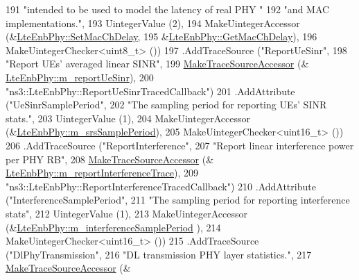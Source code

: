 \begin{DoxyCode}
191                    \textcolor{stringliteral}{"intended to be used to model the latency of real PHY "}
192                    \textcolor{stringliteral}{"and MAC implementations."},
193                    UintegerValue (2),
194                    MakeUintegerAccessor (&\hyperlink{classns3_1_1LteEnbPhy_a969782c4f1d30e0285e70bc73bb79290}{LteEnbPhy::SetMacChDelay}, 
195                                          &\hyperlink{classns3_1_1LteEnbPhy_abffa6cd054214eff16794496a4f17b71}{LteEnbPhy::GetMacChDelay}),
196                    MakeUintegerChecker<uint8\_t> ())
197     .AddTraceSource (\textcolor{stringliteral}{"ReportUeSinr"},
198                      \textcolor{stringliteral}{"Report UEs' averaged linear SINR"},
199                      \hyperlink{group__tracing_gab21a770b9855af4e8f69f7531ea4a6b0}{MakeTraceSourceAccessor} (&
      \hyperlink{classns3_1_1LteEnbPhy_a97d34e9ba36db6eb607a40c239dd408e}{LteEnbPhy::m\_reportUeSinr}),
200                      \textcolor{stringliteral}{"ns3::LteEnbPhy::ReportUeSinrTracedCallback"})
201     .AddAttribute (\textcolor{stringliteral}{"UeSinrSamplePeriod"},
202                    \textcolor{stringliteral}{"The sampling period for reporting UEs' SINR stats."},
203                    UintegerValue (1),  
204                    MakeUintegerAccessor (&\hyperlink{classns3_1_1LteEnbPhy_a16c1df8f3a289036ffc98042e9b47094}{LteEnbPhy::m\_srsSamplePeriod}),
205                    MakeUintegerChecker<uint16\_t> ())
206     .AddTraceSource (\textcolor{stringliteral}{"ReportInterference"},
207                      \textcolor{stringliteral}{"Report linear interference power per PHY RB"},
208                      \hyperlink{group__tracing_gab21a770b9855af4e8f69f7531ea4a6b0}{MakeTraceSourceAccessor} (&
      \hyperlink{classns3_1_1LteEnbPhy_ab0680f139d0eb336e9d1d3dffcee80a1}{LteEnbPhy::m\_reportInterferenceTrace}),
209                      \textcolor{stringliteral}{"ns3::LteEnbPhy::ReportInterferenceTracedCallback"})
210     .AddAttribute (\textcolor{stringliteral}{"InterferenceSamplePeriod"},
211                    \textcolor{stringliteral}{"The sampling period for reporting interference stats"},
212                    UintegerValue (1),  
213                    MakeUintegerAccessor (&\hyperlink{classns3_1_1LteEnbPhy_a0df64498bdf6e3e601ea8567c8cc94f3}{LteEnbPhy::m\_interferenceSamplePeriod}
      ),
214                    MakeUintegerChecker<uint16\_t> ())
215     .AddTraceSource (\textcolor{stringliteral}{"DlPhyTransmission"},
216                      \textcolor{stringliteral}{"DL transmission PHY layer statistics."},
217                      \hyperlink{group__tracing_gab21a770b9855af4e8f69f7531ea4a6b0}{MakeTraceSourceAccessor} (&

\end{DoxyCode}
